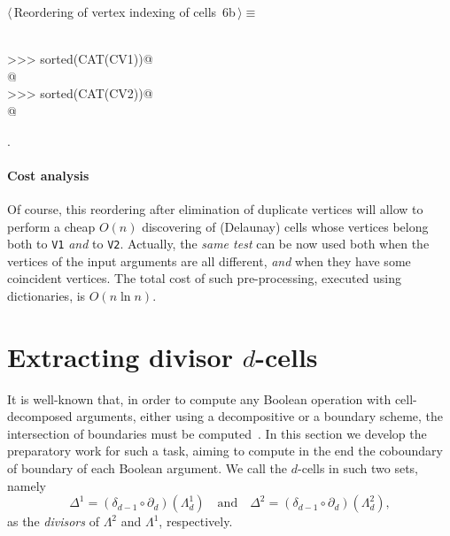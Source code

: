 \documentclass[11pt,oneside]{article}	%
\begin{document}
\begin{flushleft} \small \label{scrap11}
\protect{}$\langle\,$Reordering of vertex indexing of cells\nobreak\ {\footnotesize 6b}$\,\rangle\equiv$
\vspace{-1ex}
\begin{list}{}{} \item
\mbox{}\verb@@\\
\mbox{}\verb@>>> sorted(CAT(CV1))@\\
\mbox{}\verb@[0, 1, 1, 2, 3, 4, 5, 5]@\\
\mbox{}\verb@>>> sorted(CAT(CV2))@\\
\mbox{}\verb@[3, 4, 5, 6, 7, 7, 8, 8, 9, 10, 11]@\\
\mbox{}\verb@@{\NWsep}
\end{list}
\vspace{-1ex}
\footnotesize\addtolength{\baselineskip}{-1ex}
\begin{list}{}{\setlength{\itemsep}{-\parsep}\setlength{\itemindent}{-\leftmargin}}
\item {\NWtxtMacroNoRef}.
\end{list}
\end{flushleft}
\paragraph{Cost analysis} 
Of course, this reordering after elimination of duplicate vertices will allow to perform a cheap $O(n)$ discovering of (Delaunay) cells whose vertices belong both to \texttt{V1} \emph{and} to \texttt{V2}. 
Actually, the \emph{same test} can be now used both when the vertices of the input arguments are all different, \emph{and} when they have some coincident vertices.
The total cost of such pre-processing, executed using dictionaries, is $O(n\ln n)$.


\section{Extracting divisor $d$-cells}

It is well-known that, in order to compute any Boolean operation with cell-decomposed arguments, either using a decompositive or a boundary scheme, the intersection of boundaries must be computed~\cite{Paoluzzi:1989:BAO:70248.70249}. In this section we develop the preparatory work for such a task, aiming to compute in the end the coboundary of boundary of each Boolean argument. We call the $d$-cells in such two sets, namely
\[
\Delta^1 = (\delta_{d-1}\circ\partial_d)(\Lambda^1_d)
\quad\mbox{and}\quad
\Delta^2 = (\delta_{d-1}\circ\partial_d)(\Lambda^2_d),
\]
as the \emph{divisors} of $\Lambda^2$ and $\Lambda^1$, respectively.
\end{document}

